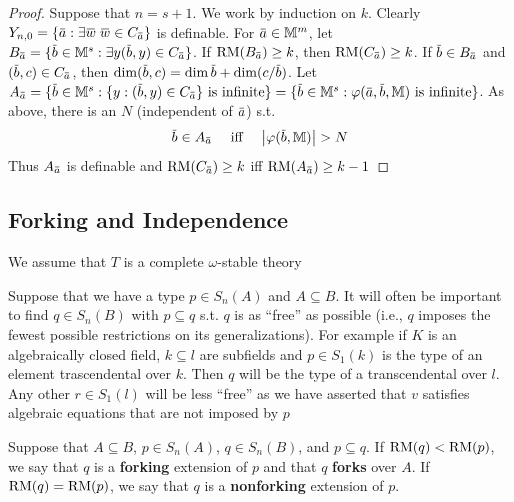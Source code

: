 \documentclass[11pt]{article}
\begin{document}
\begin{proof}
Suppose that \(n=s+1\). We work by induction on \(k\).
Clearly \(Y_{n,0}=\{\bara:\exists\barw\;\barw\in C_{\bara}\}\) is definable. For \(\bara\in\M^m\),
let \(B_{\bara}=\{\barb\in\M^s:\exists y(\barb,y)\in C_{\bara}\}\). If \(\RM(B_{\bara})\ge k\),
then \(\RM(C_{\bara})\ge k\).
If \(\barb\in B_{\bara}\) and \((\barb,c)\in C_{\bara}\),
then \(\dim(\barb,c)=\dim\barb+\dim(c/\barb)\).
Let
\(A_{\bara}=\{\barb\in\M^s:\{y:(\barb,y)\in C_{\bara}\}\text{ is infinite}\}=\{\barb\in\M^s:\varphi(\bara,\barb,\M)\text{ is infinite}\}\).
As above, there is an \(N\) (independent of \(\bara\)) s.t.
\begin{equation*}
\barb\in A_{\bara} \quad\text{ iff }\quad\abs{\varphi(\barb,\M)}>N
\end{equation*}
Thus \(A_{\bara}\) is definable and \(\RM(C_{\bara})\ge k\) iff \(\RM(A_{\bara})\ge k-1\)
\end{proof}
\subsection{Forking and Independence}
\label{sec:org035d1ef}
We assume that \(T\) is a complete \(\omega\)-stable theory

Suppose that we have a type \(p\in S_n(A)\) and \(A\subseteq B\). It will often be important to
find \(q\in S_n(B)\) with \(p\subseteq q\) s.t. \(q\) is as ``free'' as possible (i.e., \(q\) imposes the
fewest possible restrictions on its generalizations). For example if \(K\) is an algebraically
closed field, \(k\subseteq l\) are subfields and \(p\in S_1(k)\) is the type of an element trascendental
over \(k\). Then \(q\) will be the type of a transcendental over \(l\). Any other \(r\in S_1(l)\)
will be less ``free'' as we have asserted that \(v\) satisfies algebraic equations that are not
imposed by \(p\)

\begin{definition}[]
Suppose that \(A\subseteq B\), \(p\in S_n(A)\), \(q\in S_n(B)\), and \(p\subseteq q\). If \(\operatorname{RM}(q)<\operatorname{RM}(p)\), we say
that \(q\) is a \textbf{forking} extension of \(p\) and that \(q\) \textbf{forks} over \(A\).
If \(\operatorname{RM}(q)=\operatorname{RM}(p)\), we say that \(q\) is a \textbf{nonforking} extension of \(p\).
\end{definition}
\end{document}
